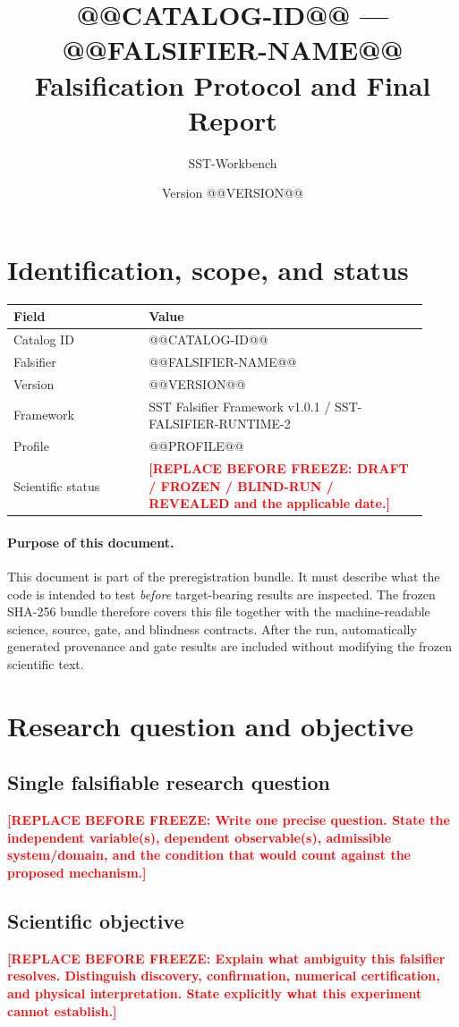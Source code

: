 \documentclass[11pt,a4paper]{article}
\title{@@CATALOG-ID@@ --- @@FALSIFIER-NAME@@\\Falsification Protocol and Final Report}
\author{SST-Workbench}
\date{Version @@VERSION@@}
\newcommand{\SSTTODO}[1]{\ifmmode\text{\color{red}\bfseries TODO}\else\textcolor{red}{\textbf{[REPLACE BEFORE FREEZE: #1]}}\fi}
\begin{document}
\maketitle

\section{Identification, scope, and status}
\begin{longtable}{p{0.30\linewidth}p{0.62\linewidth}}
\toprule
Field & Value \\
\midrule
Catalog ID & @@CATALOG-ID@@ \\
Falsifier & @@FALSIFIER-NAME@@ \\
Version & @@VERSION@@ \\
Framework & SST Falsifier Framework v1.0.1 / SST-FALSIFIER-RUNTIME-2 \\
Profile & @@PROFILE@@ \\
Scientific status & \SSTTODO{DRAFT / FROZEN / BLIND-RUN / REVEALED and the applicable date.} \\
\bottomrule
\end{longtable}

\paragraph{Purpose of this document.}
This document is part of the preregistration bundle. It must describe what the code is intended to test \emph{before} target-bearing results are inspected. The frozen SHA-256 bundle therefore covers this file together with the machine-readable science, source, gate, and blindness contracts. After the run, automatically generated provenance and gate results are included without modifying the frozen scientific text.

\section{Research question and objective}
\subsection{Single falsifiable research question}
\SSTTODO{Write one precise question. State the independent variable(s), dependent observable(s), admissible system/domain, and the condition that would count against the proposed mechanism.}

\subsection{Scientific objective}
\SSTTODO{Explain what ambiguity this falsifier resolves. Distinguish discovery, confirmation, numerical certification, and physical interpretation. State explicitly what this experiment cannot establish.}
\end{document}
